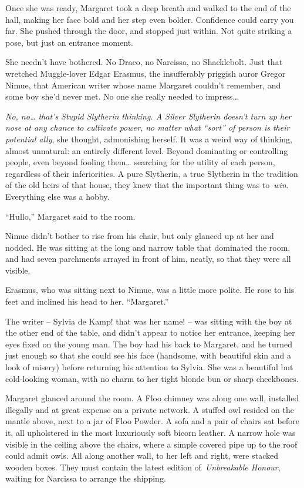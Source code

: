 Once she was ready, Margaret took a deep breath and walked to the end of
the hall, making her face bold and her step even bolder. Confidence
could carry you far. She pushed through the door, and stopped just
within. Not quite striking a pose, but just an entrance moment.

She needn't have bothered. No Draco, no Narcissa, no Shacklebolt. Just
that wretched Muggle-lover Edgar Erasmus, the insufferably priggish
auror Gregor Nimue, that American writer whose name Margaret couldn't
remember, and some boy she'd never met. No one she really needed to
impress\ldots{}

\emph{No, no\ldots{} that's Stupid Slytherin thinking. A Silver
Slytherin doesn't turn up her nose at any chance to cultivate power, no
matter what ``sort'' of person is their potential ally}, she thought,
admonishing herself. It was a weird way of thinking, almost unnatural:
an entirely different level. Beyond dominating or controlling people,
even beyond fooling them\ldots{} searching for the utility of each
person, regardless of their inferiorities. A pure Slytherin, a true
Slytherin in the tradition of the old heirs of that house, they knew
that the important thing was to~\emph{win}. Everything else was a hobby.

``Hullo,'' Margaret said to the room.

Nimue didn't bother to rise from his chair, but only glanced up at her
and nodded. He was sitting at the long and narrow table that dominated
the room, and had seven parchments arrayed in front of him, neatly, so
that they were all visible.

Erasmus, who was sitting next to Nimue, was a little more polite. He
rose to his feet and inclined his head to her. ``Margaret.''

The writer -- Sylvia de Kamp! that was her name! -- was sitting with the
boy at the other end of the table, and didn't appear to notice her
entrance, keeping her eyes fixed on the young man. The boy had his back
to Margaret, and he turned just enough so that she could see his face
(handsome, with beautiful skin and a look of misery) before returning
his attention to Sylvia. She was a beautiful but cold-looking woman,
with no charm to her tight blonde bun or sharp cheekbones.

Margaret glanced around the room. A Floo chimney was along one wall,
installed illegally and at great expense on a private network. A stuffed
owl resided on the mantle above, next to a jar of Floo Powder. A sofa
and a pair of chairs sat before it, all upholstered in the most
luxuriously soft bicorn leather. A narrow hole was visible in the
ceiling above the chairs, where a simple covered pipe up to the roof
could admit owls. All along another wall, to her left and right, were
stacked wooden boxes. They must contain the latest edition
of~\emph{Unbreakable Honour}, waiting for Narcissa to arrange the
shipping.

